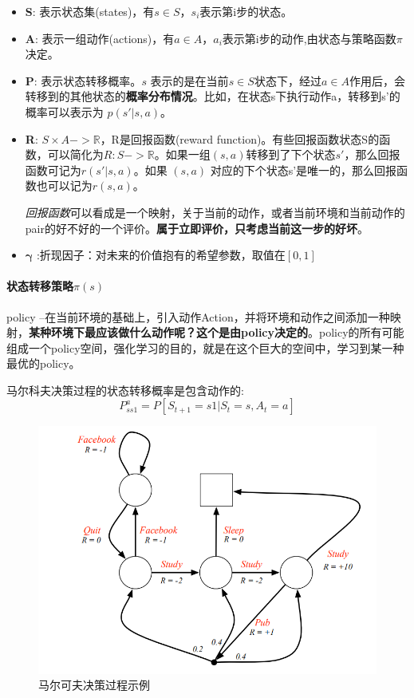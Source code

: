 \documentclass[UTF8,a4paper,12pt]{ctexbook}
\begin{document}
			\begin{itemize}[itemindent = 1em]
				\item \textbf{S}: 表示状态集(states)，有$s \in S$，$s_i$表示第i步的状态。
				
				\item \textbf{A}: 表示一组动作(actions)，有$a \in A$，$a_i$表示第i步的动作,由状态与策略函数$\pi$ 决定。
				
				\item \textbf{P}: 表示状态转移概率。$s$ 表示的是在当前$s \in S$状态下，经过$a \in A$作用后，会转移到的其他状态的\textbf{概率分布情况}。比如，在状态s下执行动作a，转移到s'的概率可以表示为 $p(s'|s,a)$。
				
				\item \textbf{R}: $S \times A->\mathbb{R}$，R是回报函数(reward function)。有些回报函数状态S的函数，可以简化为$R:S->\mathbb{R}$。如果一组$(s,a)$转移到了下个状态$s'$，那么回报函数可记为$r(s'|s, a)$。如果 $(s,a)$ 对应的下个状态s'是唯一的，那么回报函数也可以记为$r(s,a)$。
				
				\textit{回报函数}可以看成是一个映射，关于当前的动作，或者当前环境和当前动作的pair的好不好的一个评价。\textbf{属于立即评价，只考虑当前这一步的好坏}。
				
				\item $\mathbf{\gamma}$ :折现因子：对未来的价值抱有的希望参数，取值在$[0,1]$
			\end{itemize}
			
			
			\paragraph{状态转移策略$\pi(s)$}	
				policy --在当前环境的基础上，引入动作Action，并将环境和动作之间添加一种映射，\textbf{某种环境下最应该做什么动作呢？这个是由policy决定的}。policy的所有可能组成一个policy空间，强化学习的目的，就是在这个巨大的空间中，学习到某一种最优的policy。
			
			
				马尔科夫决策过程的状态转移概率是包含动作的:
				$$ P_{ss1}^a = P[S_{t+1} = s1 | S_t = s, A_t = a]$$
				
				\begin{figure}[H]
					\centering
					\includegraphics[width=.7\linewidth]{MDP-example2}
					\caption{马尔可夫决策过程示例}
				\end{figure}			
				
\end{document}
